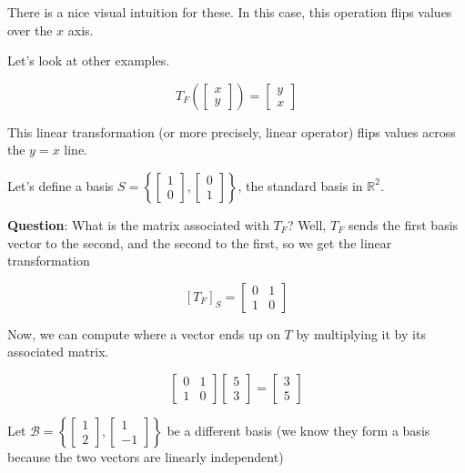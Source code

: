 \documentclass[12pt]{article}
\def\R{{\mathbb R}}
\def\B{\mathcal B}
\begin{document}
  There is a nice visual intuition for these. In this case, this operation flips
  values over the $x$ axis.

  Let's look at other examples.

  \[
    T_F \left(\begin{bmatrix} x \\ y \end{bmatrix}\right) = \begin{bmatrix} y \\ x \end{bmatrix}
  \]

  This linear transformation (or more precisely, linear operator) flips values
  across the $y = x$ line.

  Let's define a basis $S = \left\{\begin{bmatrix} 1 \\ 0 \end{bmatrix},
  \begin{bmatrix} 0 \\ 1 \end{bmatrix}\right\}$, the standard basis in $\R^2$.

  {\bf Question}: What is the matrix associated with $T_F$? Well, $T_F$ sends
  the first basis vector to the second, and the second to the first, so we get
  the linear transformation

  \[
    [T_F]_S = \begin{bmatrix}
      0 & 1 \\
      1 & 0
    \end{bmatrix}
  \]

  Now, we can compute where a vector ends up on $T$ by multiplying it by its
  associated matrix.

  \[
    \begin{bmatrix}
      0 & 1 \\
      1 & 0
    \end{bmatrix}
    \begin{bmatrix}
      5 \\ 3
    \end{bmatrix}
    =
    \begin{bmatrix}
      3 \\ 5
    \end{bmatrix}
  \]

  Let $\B = \left\{\begin{bmatrix} 1 \\ 2 \end{bmatrix}, \begin{bmatrix} 1 \\ -1
  \end{bmatrix}\right\}$ be a different basis (we know they form a basis because the two
  vectors are linearly independent)
\end{document}
